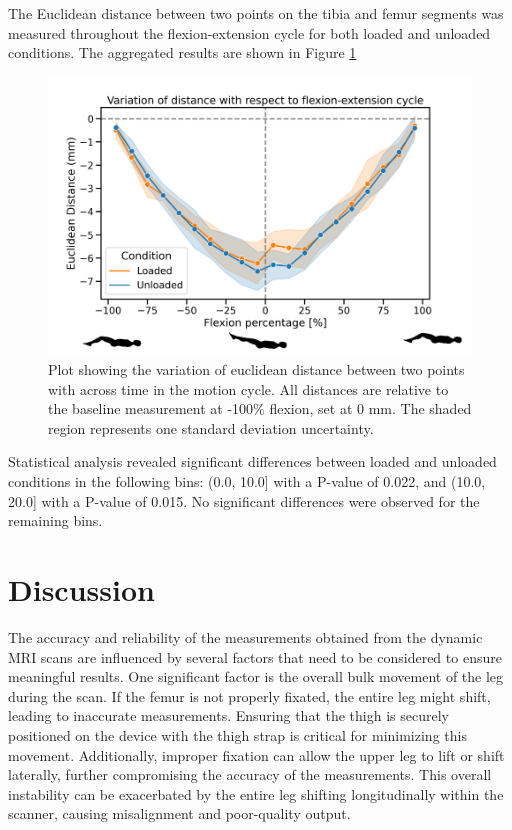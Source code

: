 \documentclass{micro-econ-thesis}
\begin{document}
The Euclidean distance between two points on the tibia and femur segments was measured throughout the flexion-extension cycle for both loaded and unloaded conditions. The aggregated results are shown in Figure \ref{fig:resultsdistancestickman}
\begin{figure}[H]
	\centering
	\includegraphics[width=0.7\linewidth]{results_distance_stickman}
	\caption{Plot showing the variation of euclidean distance between two points with across time in the motion cycle. All distances are relative to the baseline measurement at -100\% flexion, set at 0 mm. The shaded region represents one standard deviation uncertainty.}
	\label{fig:resultsdistancestickman}
\end{figure}

Statistical analysis revealed significant differences between loaded and unloaded conditions in the following bins: (0.0, 10.0] with a P-value of 0.022, and (10.0, 20.0] with a P-value of 0.015. No significant differences were observed for the remaining bins.

\section{Discussion}

The accuracy and reliability of the measurements obtained from the dynamic MRI scans are influenced by several factors that need to be considered to ensure meaningful results. One significant factor is the overall bulk movement of the leg during the scan. If the femur is not properly fixated, the entire leg might shift, leading to inaccurate measurements. Ensuring that the thigh is securely positioned on the device with the thigh strap is critical for minimizing this movement. Additionally, improper fixation can allow the upper leg to lift or shift laterally, further compromising the accuracy of the measurements. This overall instability can be exacerbated by the entire leg shifting longitudinally within the scanner, causing misalignment and poor-quality output.
\end{document}
